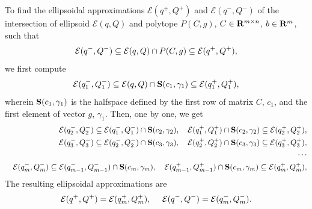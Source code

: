 \documentclass[letterpaper,10pt,english]{sphinxmanual}
\begin{document}
To find the ellipsoidal approximations \({\mathcal E}(q^+,Q^+)\) and
\({\mathcal E}(q^-,Q^-)\) of the intersection of ellipsoid
\({\mathcal E}(q,Q)\) and polytope \(P(C,g)\),
\(C\in{\bf R}^{m\times n}\), \(b\in{\bf R}^m\), such that
\begin{gather}
\begin{split}{\mathcal E}(q^-,Q^-)\subseteq{\mathcal E}(q,Q)\cap P(C,g)\subseteq{\mathcal E}(q^+,Q^+),\end{split}\notag
\end{gather}
we first compute
\begin{gather}
\begin{split}{\mathcal E}(q^-_1,Q^-_1)\subseteq{\mathcal E}(q,Q)\cap{\bf S}(c_1,\gamma_1)\subseteq
{\mathcal E}(q^+_1,Q^+_1),\end{split}\notag
\end{gather}
wherein \({\bf S}(c_1,\gamma_1)\) is the halfspace defined by the
first row of matrix \(C\), \(c_1\), and the first element of
vector \(g\), \(\gamma_1\). Then, one by one, we get
\begin{gather}
\begin{split}\begin{aligned}
& & {\mathcal E}(q^-_2,Q^-_2)\subseteq{\mathcal E}(q^-_1,Q^-_1)\cap{\bf S}(c_2,\gamma_2), ~~~
{\mathcal E}(q^+_1,Q^+_1)\cap{\bf S}(c_2,\gamma_2)\subseteq{\mathcal E}(q^+_2,Q^+_2), \\
& & {\mathcal E}(q^-_3,Q^-_3)\subseteq{\mathcal E}(q^-_2,Q^-_2)\cap{\bf S}(c_3,\gamma_3), ~~~
{\mathcal E}(q^+_2,Q^+_2)\cap{\bf S}(c_3,\gamma_3)\subseteq{\mathcal E}(q^+_3,Q^+_3), \\
& & \cdots \\
& & {\mathcal E}(q^-_m,Q^-_m)\subseteq{\mathcal E}(q^-_{m-1},Q^-_{m-1})\cap{\bf S}(c_m,\gamma_m), ~~~
{\mathcal E}(q^+_{m-1},Q^+_{m-1})\cap{\bf S}(c_m,\gamma_m)\subseteq{\mathcal E}(q^+_m,Q^+_m), \\\end{aligned}\end{split}\notag
\end{gather}
The resulting ellipsoidal approximations are
\begin{gather}
\begin{split}{\mathcal E}(q^+,Q^+)={\mathcal E}(q^+_m,Q^+_m), ~~~~ {\mathcal E}(q^-,Q^-)={\mathcal E}(q^-_m,Q^-_m) .\end{split}\notag
\end{gather}
\end{document}
